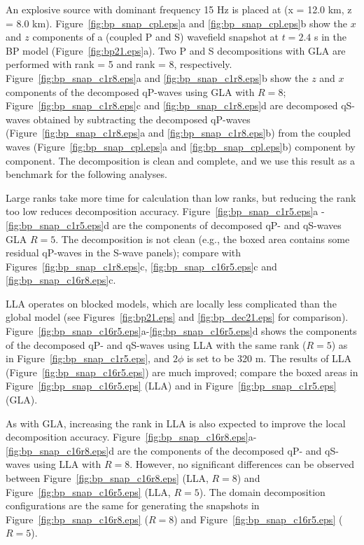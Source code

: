 \documentclass[manuscript,ulem,graphix,revised]{geophysics}
\begin{document}
An explosive source with dominant frequency 15 Hz is placed at (x = 12.0 km, z = 8.0 km). Figure~\ref{fig:bp_snap_cpl.eps}a and \ref{fig:bp_snap_cpl.eps}b show the $x$ and $z$ components of a (coupled P and S) wavefield snapshot at $t=2.4$ s in the BP model (Figure~\ref{fig:bp21.eps}a).
Two P and S decompositions with GLA are performed with rank = 5 and rank = 8, respectively.  
Figure~\ref{fig:bp_snap_c1r8.eps}a and \ref{fig:bp_snap_c1r8.eps}b show the  $z$ and $x$ components of the decomposed qP-waves using GLA with $R=8$; Figure~\ref{fig:bp_snap_c1r8.eps}c and \ref{fig:bp_snap_c1r8.eps}d are decomposed qS-waves obtained by subtracting the decomposed qP-waves (Figure~\ref{fig:bp_snap_c1r8.eps}a and \ref{fig:bp_snap_c1r8.eps}b) from the coupled waves (Figure~\ref{fig:bp_snap_cpl.eps}a and \ref{fig:bp_snap_cpl.eps}b) component by component. The decomposition is clean and complete, and we use this result as a benchmark for the following analyses. 

Large ranks take more time for calculation than low ranks, but reducing the rank too low reduces decomposition accuracy. Figure~\ref{fig:bp_snap_c1r5.eps}a - \ref{fig:bp_snap_c1r5.eps}d are the components of decomposed qP- and qS-waves GLA $R=5$. The decomposition is not clean (e.g., the boxed area contains some residual qP-waves in the S-wave panels); compare with Figures~\ref{fig:bp_snap_c1r8.eps}c, \ref{fig:bp_snap_c16r5.eps}c and \ref{fig:bp_snap_c16r8.eps}c.


LLA operates on blocked models, which are locally less complicated than the global model (see Figures~\ref{fig:bp21.eps} and \ref{fig:bp_dec21.eps} for comparison). Figure~\ref{fig:bp_snap_c16r5.eps}a-\ref{fig:bp_snap_c16r5.eps}d shows the components of the decomposed qP- and qS-waves using LLA with the same rank ($R=5$) as in Figure~\ref{fig:bp_snap_c1r5.eps}, and $2\phi$ is set to be 320 m.
The results of LLA (Figure~\ref{fig:bp_snap_c16r5.eps}) are much improved; compare the boxed areas in Figure~\ref{fig:bp_snap_c16r5.eps} (LLA) and in Figure~\ref{fig:bp_snap_c1r5.eps} (GLA). 

As with GLA, increasing the rank in LLA is also expected to improve the local decomposition accuracy. Figure~\ref{fig:bp_snap_c16r8.eps}a-\ref{fig:bp_snap_c16r8.eps}d are the components of the decomposed qP- and qS-waves using LLA with $R=8$. However, no significant differences can be observed between Figure~\ref{fig:bp_snap_c16r8.eps} (LLA, $R=8$) and Figure~\ref{fig:bp_snap_c16r5.eps} (LLA, $R=5$). The domain decomposition configurations are the same for generating the snapshots in Figure~\ref{fig:bp_snap_c16r8.eps} ($R=8$) and Figure~\ref{fig:bp_snap_c16r5.eps} ($R=5$). 
\end{document}
